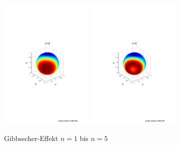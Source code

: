 \begin{refsection}
\begin{figure}
\includegraphics[width=0.4\textwidth]{kugel/Gibbs/GibbsN_4.pdf}
\includegraphics[width=0.4\textwidth]{kugel/Gibbs/GibbsN_5.pdf}
\caption{Gibbsscher-Effekt $n=1$ bis $n=5$
\label{skript:Gibbs1}}
\end{figure}


\end{refsection}
